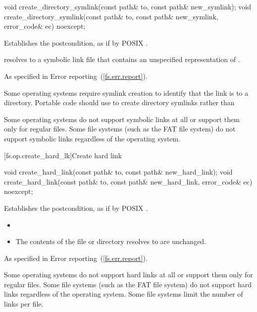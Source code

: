 %
\begin{itemdecl}
void create_directory_symlink(const path& to, const path& new_symlink);
void create_directory_symlink(const path& to, const path& new_symlink,
                              error_code& ec) noexcept;
\end{itemdecl}

\begin{itemdescr}
\pnum
\effects Establishes the postcondition, as if by POSIX .

\pnum
\postconditions {} resolves to a symbolic link file that
  contains an unspecified representation of .

\pnum
\throws As specified in Error reporting~(\ref{fs.err.report}).

\pnum
\begin{note} Some operating systems require symlink creation to
  identify that the link is to a directory. Portable code should use  to create directory symlinks rather than  \end{note}

\pnum
\begin{note} Some operating systems do not support symbolic links at all or support
  them only for regular files.
  Some file systems (such as the FAT file system) do not
  support
  symbolic links regardless of the operating system. \end{note}
\end{itemdescr}

[fs.op.create_hard_lk]{Create hard link}

%
\begin{itemdecl}
void create_hard_link(const path& to, const path& new_hard_link);
void create_hard_link(const path& to, const path& new_hard_link,
                                      error_code& ec) noexcept;
\end{itemdecl}

\begin{itemdescr}
\pnum
\effects Establishes the postcondition, as if by POSIX .

\pnum
\postconditions
\begin{itemize}
\item {}
\item The contents of the file or directory
     resolves to are unchanged.
\end{itemize}

\pnum
\throws As specified in Error reporting~(\ref{fs.err.report}).

\pnum
\begin{note} Some operating systems do not support hard links at all or support
  them only for regular files. Some file systems (such as the FAT file system)
  do not support hard links regardless of the operating system.
  Some file systems limit the number of links per file. \end{note}
\end{itemdescr}

